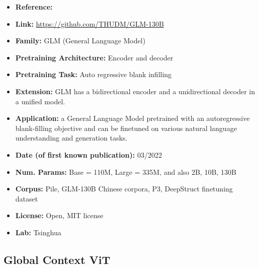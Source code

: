 \documentclass{article}
\begin{document}
            \begin{itemize}
                \item \textbf{Reference:} \href{https://arxiv.org/abs/2103.10360}{}
                \item \textbf{Link:} \url{https://github.com/THUDM/GLM-130B}
                \item \textbf{Family:} GLM (General Language Model)
                \item \textbf{Pretraining Architecture:} Encoder and decoder
                \item \textbf{Pretraining Task:} Auto regressive blank infilling
                \item \textbf{Extension:} GLM has a bidirectional encoder and a unidirectional decoder in a unified model.
                \item \textbf{Application:} a General Language Model pretrained with an autoregressive blank-filling objective and can be finetuned on various natural language understanding and generation tasks.
                \item \textbf{Date (of first known publication):} 03/2022
                \item \textbf{Num. Params:} Base = 110M, Large = 335M, and also 2B, 10B, 130B
                \item \textbf{Corpus:} Pile, GLM-130B Chinese corpora, P3, DeepStruct finetuning dataset
                \item \textbf{License:} Open, MIT license
                \item \textbf{Lab:} Tsinghua
            \end{itemize}
            
\subsection{Global Context ViT}
\end{document}
